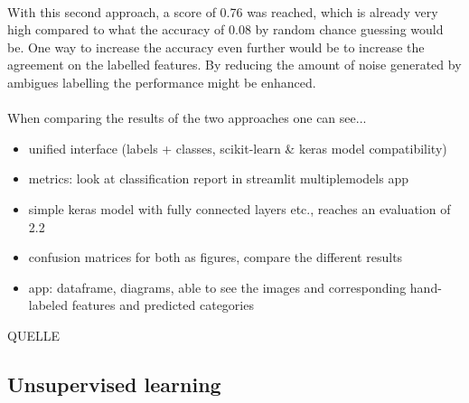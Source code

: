 \\
With this second approach, a score of 0.76 was reached, which is already very high compared to what the accuracy of 0.08 by random chance guessing would be. One way to increase the accuracy even further would be to increase the agreement on the labelled features. By reducing the amount of noise generated by ambigues labelling the performance might be enhanced. \\
\\
When comparing the results of the two approaches one can see...
\begin{itemize}
\item unified interface (labels + classes, scikit-learn & keras model compatibility)
\item metrics: look at classification report in streamlit multiple\textunderscore models app
\item simple keras model with fully connected layers etc., reaches an evaluation of 2.2
\item confusion matrices for both as figures, compare the different results
\item app: dataframe, diagrams, able to see the images and corresponding hand-labeled features and predicted categories
\end{itemize}

QUELLE~\citep{friedman2001elements}


\subsection{Unsupervised learning}


